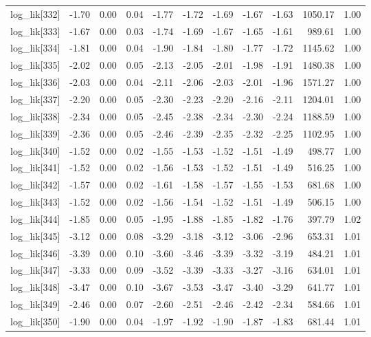 \begin{table}[ht]
\begin{tabular}{rrrrrrrrrrr}
  log\_lik[332] & -1.70 & 0.00 & 0.04 & -1.77 & -1.72 & -1.69 & -1.67 & -1.63 & 1050.17 & 1.00 \\ 
  log\_lik[333] & -1.67 & 0.00 & 0.03 & -1.74 & -1.69 & -1.67 & -1.65 & -1.61 & 989.61 & 1.00 \\ 
  log\_lik[334] & -1.81 & 0.00 & 0.04 & -1.90 & -1.84 & -1.80 & -1.77 & -1.72 & 1145.62 & 1.00 \\ 
  log\_lik[335] & -2.02 & 0.00 & 0.05 & -2.13 & -2.05 & -2.01 & -1.98 & -1.91 & 1480.38 & 1.00 \\ 
  log\_lik[336] & -2.03 & 0.00 & 0.04 & -2.11 & -2.06 & -2.03 & -2.01 & -1.96 & 1571.27 & 1.00 \\ 
  log\_lik[337] & -2.20 & 0.00 & 0.05 & -2.30 & -2.23 & -2.20 & -2.16 & -2.11 & 1204.01 & 1.00 \\ 
  log\_lik[338] & -2.34 & 0.00 & 0.05 & -2.45 & -2.38 & -2.34 & -2.30 & -2.24 & 1188.59 & 1.00 \\ 
  log\_lik[339] & -2.36 & 0.00 & 0.05 & -2.46 & -2.39 & -2.35 & -2.32 & -2.25 & 1102.95 & 1.00 \\ 
  log\_lik[340] & -1.52 & 0.00 & 0.02 & -1.55 & -1.53 & -1.52 & -1.51 & -1.49 & 498.77 & 1.00 \\ 
  log\_lik[341] & -1.52 & 0.00 & 0.02 & -1.56 & -1.53 & -1.52 & -1.51 & -1.49 & 516.25 & 1.00 \\ 
  log\_lik[342] & -1.57 & 0.00 & 0.02 & -1.61 & -1.58 & -1.57 & -1.55 & -1.53 & 681.68 & 1.00 \\ 
  log\_lik[343] & -1.52 & 0.00 & 0.02 & -1.56 & -1.54 & -1.52 & -1.51 & -1.49 & 506.15 & 1.00 \\ 
  log\_lik[344] & -1.85 & 0.00 & 0.05 & -1.95 & -1.88 & -1.85 & -1.82 & -1.76 & 397.79 & 1.02 \\ 
  log\_lik[345] & -3.12 & 0.00 & 0.08 & -3.29 & -3.18 & -3.12 & -3.06 & -2.96 & 653.31 & 1.01 \\ 
  log\_lik[346] & -3.39 & 0.00 & 0.10 & -3.60 & -3.46 & -3.39 & -3.32 & -3.19 & 484.21 & 1.01 \\ 
  log\_lik[347] & -3.33 & 0.00 & 0.09 & -3.52 & -3.39 & -3.33 & -3.27 & -3.16 & 634.01 & 1.01 \\ 
  log\_lik[348] & -3.47 & 0.00 & 0.10 & -3.67 & -3.53 & -3.47 & -3.40 & -3.29 & 641.77 & 1.01 \\ 
  log\_lik[349] & -2.46 & 0.00 & 0.07 & -2.60 & -2.51 & -2.46 & -2.42 & -2.34 & 584.66 & 1.01 \\ 
  log\_lik[350] & -1.90 & 0.00 & 0.04 & -1.97 & -1.92 & -1.90 & -1.87 & -1.83 & 681.44 & 1.01 \\ 

\end{tabular}
\end{table}
